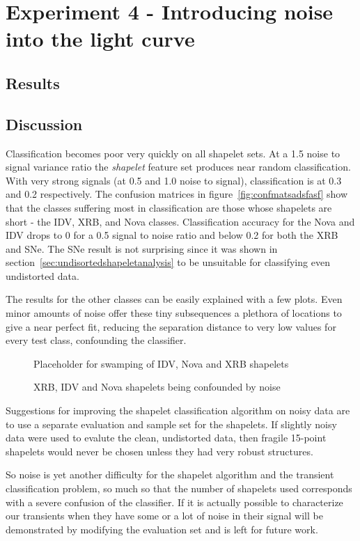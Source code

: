 \clearpage

\section{Experiment 4 - Introducing noise into the light curve}
\subsection{Results}

\clearpage
\subsection{Discussion}
Classification becomes poor very quickly on all shapelet sets. At a 1.5 noise to signal variance ratio the \emph{shapelet} feature set produces near random classification. With very strong signals (at 0.5 and 1.0 noise to signal), classification is at 0.3 and 0.2 respectively. The confusion matrices in figure~\ref{fig:confmatsadsfasf} show that the classes suffering most in classification are those whose shapelets are short - the IDV, XRB, and Nova classes. Classification accuracy for the Nova and IDV drops to 0 for a 0.5 signal to noise ratio and below 0.2 for both the XRB and SNe. The SNe result is not surprising since it was shown in section~\ref{sec:undisortedshapeletanalysis} to be unsuitable for classifying even undistorted data.

The results for the other classes can be easily explained with a few plots. Even minor amounts of noise offer these tiny subsequences a plethora of locations to give a near perfect fit, reducing the separation distance to very low values for every test class, confounding the classifier.

\begin{figure}[ht!]
	\label{fig:noisyshapelets}
	Placeholder for swamping of IDV, Nova and XRB shapelets
	\caption{XRB, IDV and Nova shapelets being confounded by noise}
\end{figure}

Suggestions for improving the shapelet classification algorithm on noisy data are to use a separate evaluation and sample set for the shapelets. If slightly noisy data were used to evalute the clean, undistorted data, then fragile 15-point shapelets would never be chosen unless they had very robust structures.

So noise is yet another difficulty for the shapelet algorithm and the transient classification problem, so much so that the number of shapelets used corresponds with a severe confusion of the classifier. If it is actually possible to characterize our transients when they have some or a lot of noise in their signal will be demonstrated by modifying the evaluation set and is left for future work.
\clearpage

